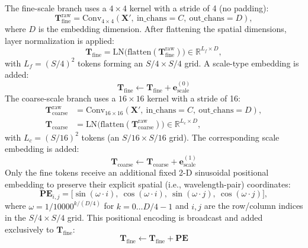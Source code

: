 \documentclass[pdflatex,sn-mathphys-num]{sn-jnl}%
\begin{document}
The fine-scale branch uses a $4\times 4$ kernel with a stride of 4 (no padding):
\begin{equation}
    \mathbf{T}_\text{fine}^\text{raw} = \text{Conv}_{4\times4}(\mathbf{X}',\ \text{in\_chans}=C,\ \text{out\_chans}=D),
\end{equation}
where $D$ is the embedding dimension. After flattening the spatial dimensions, layer normalization is applied:
\begin{equation}
    \mathbf{T}_\text{fine} = \text{LN}\bigl(\text{flatten}(\mathbf{T}_\text{fine}^\text{raw})\bigr) \in \mathbb{R}^{L_f \times D},
\end{equation}
with $L_f = (S/4)^2$ tokens forming an $S/4 \times S/4$ grid. A scale-type embedding is added:
\begin{equation}
    \mathbf{T}_\text{fine} \leftarrow \mathbf{T}_\text{fine} + \mathbf{e}_\text{scale}^{(0)}
\end{equation}
The coarse-scale branch uses a $16\times 16$ kernel with a stride of 16:
\begin{equation}
    \begin{split}
        \mathbf{T}_\text{coarse}^\text{raw} &= \text{Conv}_{16\times16}(\mathbf{X}',\ \text{in\_chans}=C,\ \text{out\_chans}=D), \\
        \mathbf{T}_\text{coarse} &= \text{LN}\bigl(\text{flatten}(\mathbf{T}_\text{coarse}^\text{raw})\bigr) \in \mathbb{R}^{L_c \times D},
    \end{split}
\end{equation}
with $L_c=(S/16)^2$ tokens (an $S/16 \times S/16$ grid). The corresponding scale embedding is added:
\begin{equation}
    \mathbf{T}_\text{coarse} \leftarrow \mathbf{T}_\text{coarse} + \mathbf{e}_\text{scale}^{(1)}
\end{equation}
Only the fine tokens receive an additional fixed 2-D sinusoidal positional embedding to preserve their explicit spatial (i.e., wavelength-pair) coordinates:
\begin{equation}
    \mathbf{PE}_{i,j} = \bigl[\sin(\omega \cdot i),\ \cos(\omega \cdot i),\ \sin(\omega \cdot j),\ \cos(\omega \cdot j)\bigr],
\end{equation}
where $\omega = 1/10000^{k/(D/4)}$ for $k = 0 \dots D/4-1$ and $i,j$ are the row/column indices in the $S/4 \times S/4$ grid. This positional encoding is broadcast and added exclusively to $\mathbf{T}_\text{fine}$:
\begin{equation}
    \mathbf{T}_\text{fine} \leftarrow \mathbf{T}_\text{fine} + \mathbf{PE}
\end{equation}
\end{document}
